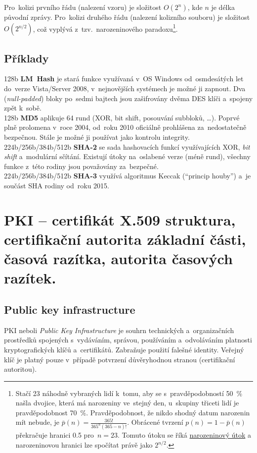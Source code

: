 Pro~kolizi prvního řádu (nalezení vzoru) je složitost $O(2^n)$, kde $n$ je délka původní zprávy. Pro~kolizi druhého řádu (nalezení kolizního souboru) je složitost $O(2^{n/2})$, což vyplývá z~tzv.~narozeninového paradoxu\footnote{
Stačí 23 náhodně vybraných lidí k~tomu, aby se s~pravděpodobností 50~\% našla dvojice, která má narozeniny ve~stejný den, u~skupiny třiceti lidí je pravděpodobnost 70~\%. Pravděpodobnost, že nikdo shodný datum narozenin mít nebude, je $\bar{p}(n) = \frac{365!}{365^n(365 - n)!}$. Obrácené tvrzení $p(n) = 1 - \bar{p}(n)$ překračuje hranici 0.5 pro~$n=23$.
Tomuto útoku se říká \href{https://en.wikipedia.org/wiki/Birthday_attack}{narozeninový útok} a narozeninovou hranici lze spočítat právě jako $2^{n/2}$.
}.

\subsection{Příklady}

128b \textbf{LM~Hash} je stará funkce využívaná v~OS Windows od~osmdesátých let do~verze Vista/Server 2008, v~nejnovějších systémech je možné ji zapnout. Dva (\emph{null-padded}) bloky po~sedmi bajtech jsou zašifrovány dvěma DES klíči a~spojeny zpět k~sobě. \\
128b \textbf{MD5} aplikuje 64 rund (XOR, bit shift, posouvání subbloků, \dots). Poprvé plně prolomena v~roce 2004, od~roku 2010 oficiálně prohlášena za~nedostatečně bezpečnou. Stále je možné ji používat jako kontrolu integrity. \\
224b/256b/384b/512b \textbf{SHA-2} se sada hashovacích funkcí využívajících XOR, \emph{bit shift} a~modulární sčítání. Existují útoky na~oslabené verze (méně rund), všechny funkce z~této rodiny jsou považovány za~bezpečné. \\
224b/256b/384b/512b \textbf{SHA-3} využívá algoritmus Keccak (\enquote{princip houby}) a~je součást SHA rodiny od~roku 2015.

\clearpage
\section{PKI -- certifikát X.509 struktura, certifikační autorita základní části, časová razítka, autorita časových razítek.}

\subsection{Public key infrastructure}

PKI neboli \emph{Public Key Infrastructure} je souhrn technických a~organizačních prostředků spojených s~vydáváním, správou, používáním a~odvoláváním platnosti kryptografických klíčů a~certifikátů. Zabraňuje použití falešné identity. Veřejný klíč je platný pouze v~případě potvrzení důvěryhodnou stranou (certifikační autoritou).

